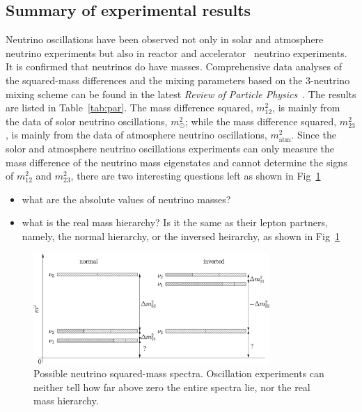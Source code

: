 \subsection{Summary of experimental results}
\label{sec:allo}
Neutrino oscillations have been observed not only in solar and
atmosphere neutrino experiments but also in reactor and
accelerator~\cite{Dod06,Agu07} neutrino experiments. It is confirmed
that neutrinos do have masses. Comprehensive data analyses of the
squared-mass differences and the mixing parameters based on the
3-neutrino mixing scheme can be found in the latest \emph{Review of  
Particle Physics}~\cite{PDG07}. The results are listed in
Table~\ref{tab:par}. The mass difference squared, $m^{2}_{12}$, is
mainly from the data of solor neutrino oscillations, $m^{2}_\odot$;
while the mass difference squared, $m^{2}_{23}$, is mainly from the
data of atmosphere neutrino oscillations, $m^{2}_{\mbox{atm}}$. Since
the solor and atmosphere neutrino oscillations experiments can only
measure the mass difference of the neutrino mass eigenstates and
cannot determine the signs of $m^{2}_{12}$ and $m^{2}_{23}$, there are
two interesting questions left as shown in Fig~\ref{fig:hie}
\begin{itemize}
\item what are the absolute values of neutrino masses?
\item what is the real mass hierarchy? Is it the same as their lepton
partners, namely, the normal hierarchy, or the inversed heirarchy, as
shown in Fig~\ref{fig:hie}
\end{itemize}
\begin{figure}[tbhp]
  \centering
  \includegraphics[width=0.8\textwidth]{massHierarchy.eps}  
  \caption{Possible neutrino squared-mass spectra. Oscillation    
experiments can neither tell how far above zero the entire spectra    
lie, nor the real mass hierarchy.}
  \label{fig:hie}
\end{figure}

